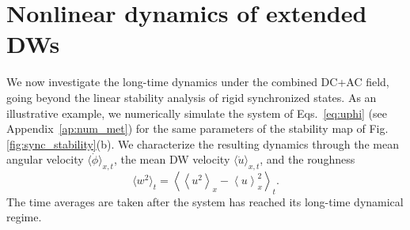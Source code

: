 \documentclass[prb,aps,twocolumn,superscriptaddress,floatfix]{revtex4-1}
\newcommand{\aleadd}[1]{{\color{blue}#1}}
\newcommand{\alecom}[1]{{\color{red}#1}}
\newcommand{\fabriq}[1]{{\color{red!60!blue}#1}}
\begin{document}



\aleadd{
\section{Nonlinear dynamics of extended DWs}\label{sec:nonlinear}

We now investigate the long-time dynamics under the combined DC+AC field, going beyond the linear stability analysis of rigid synchronized states. As an illustrative example, we numerically simulate the system of Eqs.~\eqref{eq:uphi} (see Appendix~\ref{ap:num_met}) for the same parameters of the stability map of Fig. \ref{fig:sync_stability}(b). We characterize the resulting dynamics through the mean angular velocity $\langle\dot\phi\rangle_{x,t}$, the mean DW velocity $\langle\dot u\rangle_{x,t}$, and the roughness
%
\begin{equation}
\langle w^2\rangle_t =
\left\langle
\left\langle u^2\right\rangle_x
-\left\langle u\right\rangle_x^2
\right\rangle_t .
\label{eq:roughnessvst}
\end{equation}
%
The time averages are taken after the system has reached its long-time dynamical regime.}
\end{document}
